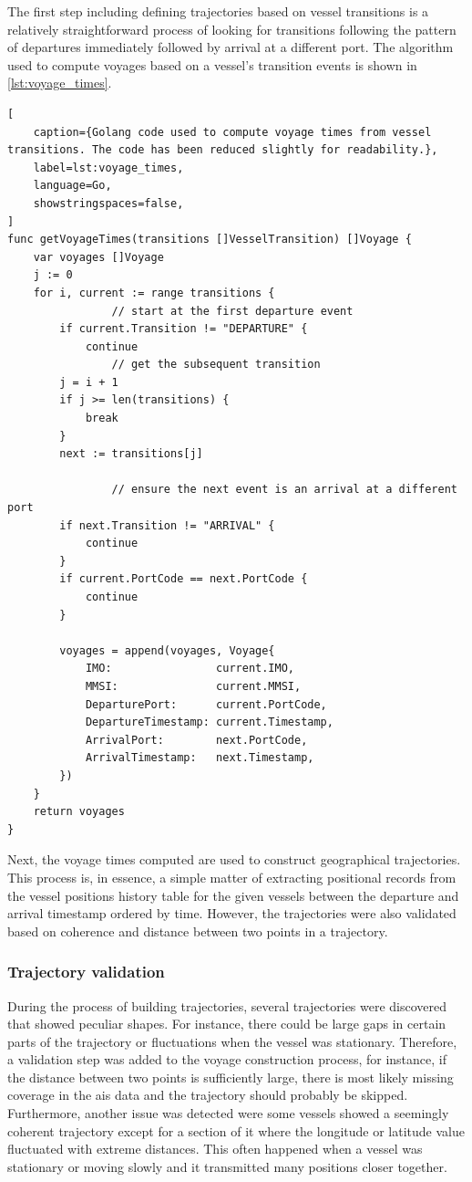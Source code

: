 The first step including defining trajectories based on vessel transitions is a relatively straightforward process of looking for transitions following the pattern of departures immediately followed by arrival at a different port. The algorithm used to compute voyages based on a vessel's transition events is shown in \cref{lst:voyage_times}.

\begin{lstlisting}[
    caption={Golang code used to compute voyage times from vessel transitions. The code has been reduced slightly for readability.},
    label=lst:voyage_times,
    language=Go,
    showstringspaces=false,
]
func getVoyageTimes(transitions []VesselTransition) []Voyage {
	var voyages []Voyage
	j := 0
	for i, current := range transitions {
                // start at the first departure event
		if current.Transition != "DEPARTURE" {
			continue
                // get the subsequent transition
		j = i + 1
		if j >= len(transitions) {
			break
		}
		next := transitions[j]

                // ensure the next event is an arrival at a different port
		if next.Transition != "ARRIVAL" {
			continue
		}
		if current.PortCode == next.PortCode {
			continue
		}

		voyages = append(voyages, Voyage{
			IMO:                current.IMO,
			MMSI:               current.MMSI,
			DeparturePort:      current.PortCode,
			DepartureTimestamp: current.Timestamp,
			ArrivalPort:        next.PortCode,
			ArrivalTimestamp:   next.Timestamp,
		})
	}
	return voyages
}
\end{lstlisting}

Next, the voyage times computed are used to construct geographical trajectories. This process is, in essence, a simple matter of extracting positional records from the vessel positions history table for the given vessels between the departure and arrival timestamp ordered by time. However, the trajectories were also validated based on coherence and distance between two points in a trajectory.

\subsubsection{Trajectory validation}

During the process of building trajectories, several trajectories were discovered that showed peculiar shapes. For instance, there could be large gaps in certain parts of the trajectory or fluctuations when the vessel was stationary. Therefore, a validation step was added to the voyage construction process, for instance, if the distance between two points is sufficiently large, there is most likely missing coverage in the \acrshort{ais} data and the trajectory should probably be skipped. Furthermore, another issue was detected were some vessels showed a seemingly coherent trajectory except for a section of it where the longitude or latitude value fluctuated with extreme distances. This often happened when a vessel was stationary or moving slowly and it transmitted many positions closer together.

